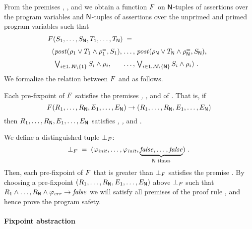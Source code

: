 From the premises , , and  we
obtain a function $F$ on $\mathsf{N}$-tuples of assertions over the
program variables and $\mathsf{N}$-tuples of assertions over the unprimed
and primed program variables such that
%
\begin{equation}\label{eq-pre-func}
  \begin{split}
    & \eqPreFunc(S_1, \dots, S_\Num, T_1, \dots, T_\Num) \defeq \\[\jot]
    &\;\,\,  (
    \begin{array}[t]{@{}l@{\; \dots,\; }l}
      \post(\relTIdOf{1} \lor T_1\land \rho^=_1, S_1), 
      &
      \post(\relTIdOf{\Num} \lor T_\Num\land \rho^=_\Num, S_\Num),\\[2\jot]
      \Lor_{i\in\ThreadIds\setminus\set{1}}S_i \land \relTIdOf{i},
      &
      \Lor_{i\in\ThreadIds\setminus\set{\Num}}S_i \land \relTIdOf{i} )\ .
    \end{array}
\end{split}
\end{equation} 
%
We formalize the relation between $F$ and \ProofRule as
follows.
%
\begin{lemma}\label{lem-rule-fix}
      Each pre-fixpoint of $F$ satisfies the premises
\emph{,} \emph{,} and \emph{}
of \ProofRule.
That is, if
%
\begin{equation*}
  F(R_1, \dots, R_{\mathsf{N}}, E_1, \dots, E_{\mathsf{N}}) \rightarrow
  (R_1, \dots, R_{\mathsf{N}}, E_1, \dots, E_{\mathsf{N}})
\end{equation*}
%
then $R_1, \dots, R_{\mathsf{N}}, E_1, \dots, E_{\mathsf{N}}$
satisfies \emph{,} \emph{,} and
\emph{}.\eofClaim
%
\end{lemma}
%
We define a distinguished tuple $\bot_{F}$:
%
\begin{equation}\label{eq-pre-bot}
  \bot_{F} \;=\; (\varphi_{\mathit{init}},\dots,\varphi_{\mathit{init}}, \underbrace{\mathit{false}, \dots,
    \mathit{false}}_{\mathsf{N} \text{ times}})\ .
\end{equation}
%
Then, each pre-fixpoint of $F$ that is greater than
$\bot_{F}$ satisfies the premise .
By choosing a pre-fixpoint $(R_1, \dots, R_{\mathsf{N}}, E_1,
\dots, E_{\mathsf{N}})$ above $\bot_{F}$ such that $R_1 \land \dots,
R_{\mathsf{N}} \land \varphi_{\mathit{err}} \rightarrow \mathit{false}$ we will satisfy all
premises of the proof rule \ProofRule, and hence prove the program
safety.


\paragraph{Fixpoint abstraction}

